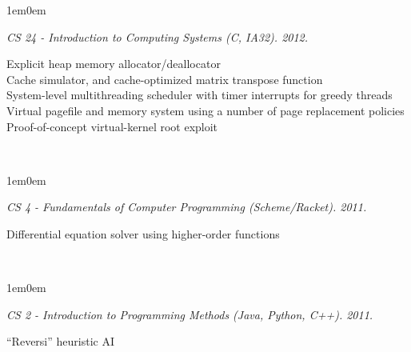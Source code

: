\documentclass[10pt,letterpaper, full]{article}
\newcommand{\pjtitle}[1]{\renewcommand{\givenpjtitle}{#1}}
\newcommand{\pjtime}[1]{\renewcommand{\givenpjtime}{#1}}
\newcommand{\pjbody}[1]{\renewcommand{\givenpjbody}{#1}}
\newcommand{\givenpjtitle}{REQUIRED!}
\newcommand{\givenpjtime}{REQUIRED!}
\newcommand{\givenpjbody}{REQUIRED!}
\newenvironment{projectenv}
    {
        \begin{adjustwidth}{1em}{0em}
    }
    {
        \textit{\givenpjtitle. \givenpjtime.}

        \begin{minipage}[l]{\textwidth}
            \givenpjbody%
        \end{minipage}\\%


        \end{adjustwidth}
    }
\begin{document}
\begin{projectenv}%
    \pjtitle{CS 24 - Introduction to Computing Systems (C, IA32)}
    \pjtime{2012}
    \pjbody{
    Explicit heap memory allocator/deallocator\\
    Cache simulator, and cache-optimized matrix transpose function\\
    System-level multithreading scheduler with timer interrupts for greedy threads\\
    Virtual pagefile and memory system using a number of page replacement policies\\
    Proof-of-concept virtual-kernel root exploit\\
    }
\end{projectenv}%

\begin{projectenv}%
    \pjtitle{CS 4 - Fundamentals of Computer Programming (Scheme/Racket)}
    \pjtime{2011}
    \pjbody{
        Differential equation solver using higher-order functions
    }
\end{projectenv}%

\begin{projectenv}%
    \pjtitle{CS 2 - Introduction to Programming Methods (Java, Python, C++)}
    \pjtime{2011}
    \pjbody{
        “Reversi” heuristic AI
    }
\end{projectenv}%
\end{document}
